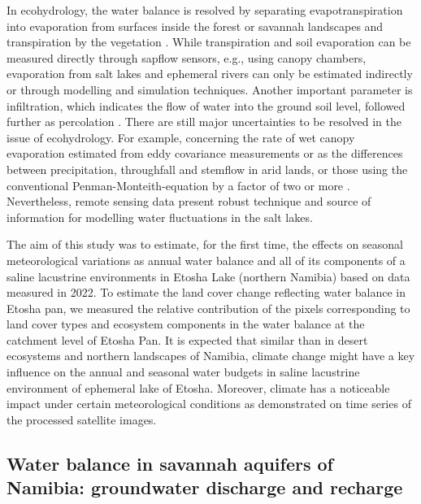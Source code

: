 \documentclass[climate,article,submit,pdftex,moreauthors]{Definitions/mdpi}
\begin{document}
{In ecohydrology, the water balance is resolved by separating evapotranspiration into evaporation from surfaces inside the forest or savannah landscapes and transpiration by the vegetation} \cite{MORGAN2020104220,ZADOROVA2025108671}. While transpiration and soil evaporation can be measured directly through sapflow sensors, e.g., using canopy chambers, evaporation from salt lakes and ephemeral rivers can only be estimated indirectly or through modelling and simulation techniques. {Another important parameter is infiltration, which indicates the flow of water into the ground soil level, followed further as percolation} \cite{Khan2014}. {There} are still major uncertainties to be resolved in {the issue of ecohydrology}. For example, concerning the rate of wet canopy evaporation estimated from eddy covariance measurements or as the differences between precipitation, throughfall and stemflow in arid lands, or those using the conventional Penman-Monteith-equation by a factor of two or more \cite{NOURANI2025113012,AHMADI2021106622,ABDULLAH2015184}. {Nevertheless, remote sensing data present robust technique and source of information for modelling water fluctuations in the salt lakes.}

{The aim of this study was to estimate, for the first time, the effects on seasonal meteorological variations as annual water balance and all of its components of a saline lacustrine environments in Etosha Lake (northern Namibia) based on data measured in 2022. To estimate the land cover change reflecting water balance in Etosha pan, we measured the relative contribution of the pixels corresponding to land cover types and ecosystem components in the water balance at the catchment level of Etosha Pan. It is expected that similar than in desert ecosystems and northern landscapes of Namibia, climate change might have a key influence on the annual and seasonal water budgets in saline lacustrine environment of ephemeral lake of Etosha. Moreover, climate has a noticeable impact under certain meteorological conditions as demonstrated on time series of the processed satellite images. }

\subsection{Water balance in savannah aquifers of Namibia: groundwater discharge and recharge }
\end{document}
